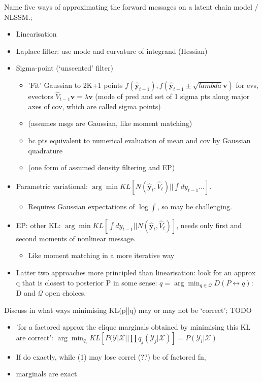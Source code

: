 \documentclass{article}
\begin{document}
Name five ways of approximating the forward messages on a latent chain model / NLSSM.; \begin{itemize}
    \item Linearisation
    \item Laplace filter: use mode and curvature of integrand (Hessian)
    \item Sigma-point (`unscented' filter) \begin{itemize}
        \item 'Fit' Gaussian to 2K+1 points $f(\hat{\mathbf{y}}_{t-1}), f(\hat{\mathbf{y}}_{t-1}\pm \sqrt{lambda}\mathbf{v})$ for evs, evectors $\hat{V}_{t-1}\mathbf{v}=\lambda\mathbf{v}$ (mode of pred and set of 1 sigma pts along major axes of cov, which are called sigma points)
        \item (assumes msgs are Gaussian, like moment matching)
        \item bc pts equivalent to numerical evaluation of mean and cov by Gaussian quadrature
        \item (one form of assumed density filtering and EP)
    \end{itemize}
    \item Parametric variational: $\arg\min KL [N(\mathbf{\hat{y}}_t, \hat{V}_t)||\int dy_{t-1}...]$. \begin{itemize}
        \item Requires Gaussian expectations of $\log \int$, so may be challenging.
    \end{itemize}
    \item EP: other KL: $\arg\min KL[\int  dy_{t-1} ||N(\hat{\mathbf{y}}_t, \hat{V}_t)]$, needs only first and second moments of nonlinear message.
    \begin{itemize}
        \item Like moment matching in a more iterative way
    \end{itemize}
    \item Latter two approaches more principled than linearisation: look for an approx q that is closest to posterior P in some sense: $q=\arg\min_{q\in\mathcal{Q}}D(P\leftrightarrow q)$: D and $\mathcal{Q}$ open choices.
\end{itemize}

Discuss in what ways minimising KL(p||q) may or may not be `correct'; TODO \begin{itemize}
    \item 'for a factored approx the clique marginals obtained by minimising this KL are correct': $\arg\min_{q_i} KL[P(\mathcal{Y}|\mathcal{X}||\prod q_j(\mathcal{Y}_j|\mathcal{X})]=P(\mathcal{Y}_i|\mathcal{X})$
    \item If do exactly, while (1) may lose correl (??) bc of factored fn,
    \item marginals are exact
\end{itemize} 
\end{document}
